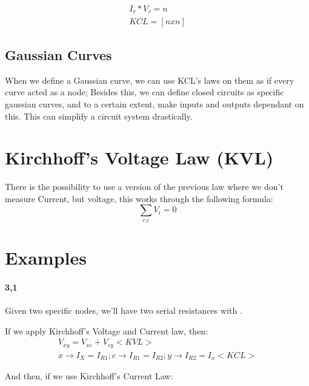 \documentclass[11pt,fleqn]{book} %
\begin{document}
\begin{gather}
    I_r * V_r = n\\
    KCL = [n x n]
\end{gather}

\subsection{Gaussian Curves}

When we define a Gaussian curve, we can use KCL's laws on them as if every curve acted
as a node; Besides this, we can define closed circuits as specific gaussian curves, and 
to a certain extent, make inputs and outputs dependant on this. This can simplify a circuit 
system drastically.

\section{Kirchhoff's Voltage Law (KVL)}

There is the possibility to use a version of the previous law where
we don't measure Current, but voltage, this works through the following formula:
$$\sum_{c.c}V_{i} = 0$$

\section{Examples}

\paragraph{3,1}

Given two specific nodes, we'll have two serial resistances with . 

If we apply Kirchhoff's Voltage and Current law, then:
\begin{gather}
    V_{xy} = V_{xc} + V_{cy} <KVL> \\
    x \to I_X = I_{R1} ; c \to I_{R1} = I_{R2} ; y \to I_{R2} = I_x <KCL>
\end{gather}

And then, if we use Kirchhoff's Current Law:
\end{document}
